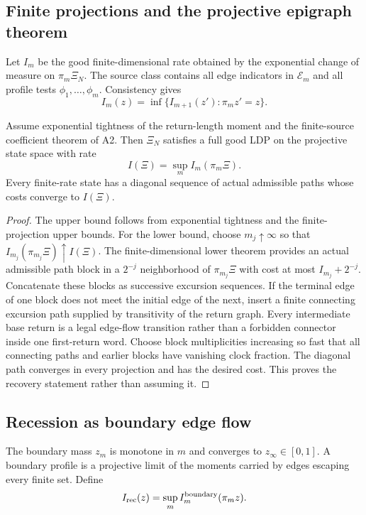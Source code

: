 \subsection{Finite projections and the projective epigraph theorem}

Let $I_m$ be the good finite-dimensional rate obtained by the exponential
change of measure on $\pi_m\Xi_N$.  The source class contains all edge
indicators in $\mathcal E_m$ and all profile tests $\phi_1,\ldots,\phi_m$.
Consistency gives
\[
 I_m(z)=\inf\{I_{m+1}(z'): \pi_m z'=z\}.
\]

\begin{theorem}
\label{thm:r8-a3-projective}
Assume exponential tightness of the return-length moment and the finite-source
coefficient theorem of A2.  Then $\Xi_N$ satisfies a full good LDP on the
projective state space with rate
\[
 I(\Xi)=\sup_m I_m(\pi_m\Xi).
\]
Every finite-rate state has a diagonal sequence of actual admissible paths
whose costs converge to $I(\Xi)$.
\end{theorem}

\begin{proof}
The upper bound follows from exponential tightness and the finite-projection
upper bounds.  For the lower bound, choose $m_j\uparrow\infty$ so that
$I_{m_j}(\pi_{m_j}\Xi)\uparrow I(\Xi)$.  The finite-dimensional lower theorem
provides an actual admissible path block in a $2^{-j}$ neighborhood of
$\pi_{m_j}\Xi$ with cost at most $I_{m_j}+2^{-j}$.  Concatenate these blocks as successive excursion sequences.  If the terminal
edge of one block does not meet the initial edge of the next, insert a finite
connecting excursion path supplied by transitivity of the return graph.
Every intermediate base return is a legal edge-flow transition rather than a
forbidden connector inside one first-return word.  Choose block multiplicities
increasing so fast that all connecting paths and earlier blocks have vanishing
clock fraction.  The diagonal path converges in every projection and has the desired
cost.  This proves the recovery statement rather than assuming it.
\end{proof}

\subsection{Recession as boundary edge flow}

The boundary mass $z_m$ is monotone in $m$ and converges to
$z_\infty\in[0,1]$.  A boundary profile is a projective limit of the moments
carried by edges escaping every finite set.  Define
\[
 I_{\rm rec}(z)=\sup_m I_m^{\rm boundary}(\pi_mz).
\]

